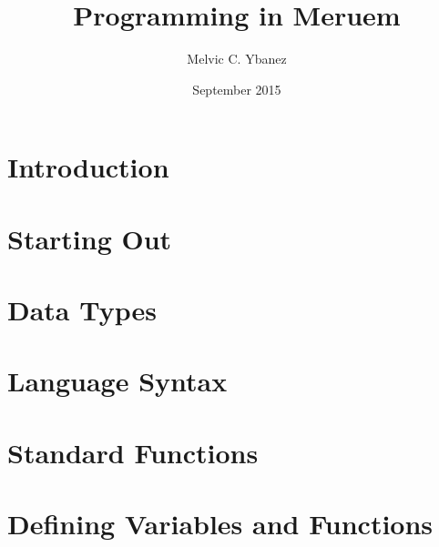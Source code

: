 \documentclass[12pt, twoside, obeyspaces]{report}
\title{Programming in Meruem}
\author{Melvic C. Ybanez}
\date{September 2015}
\begin{document}
	\maketitle
	
	\tableofcontents
	
	\chapter*{Introduction}
		
	
	\chapter{Starting Out}
	
	
	\chapter{Data Types}
	
	
	\chapter{Language Syntax}
	
	
	\chapter{Standard Functions}
	
	
	\chapter{Defining Variables and Functions}
	
\end{document}
